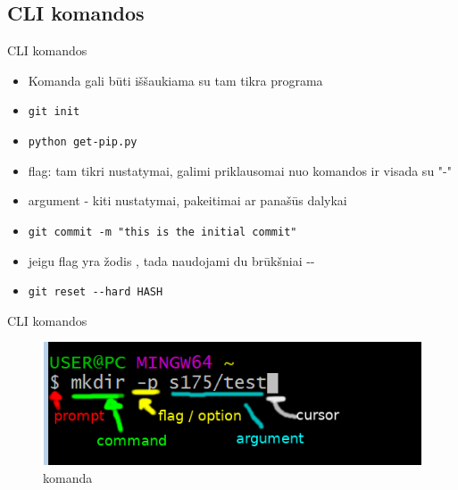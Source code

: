 \documentclass[11pt,xcolor=table]{beamer}
\begin{document}
\subsection{CLI komandos}
\begin{frame}[fragile]{CLI komandos}
\begin{itemize}
\item Komanda gali būti iššaukiama su tam tikra programa
\item \colorbox{listinggray}{\lstinline|git init|} {\color{red}{šitos komandos dabar nenaudot!}}
\item \colorbox{listinggray}{\lstinline|python get-pip.py|}{\color{red}{šitos komandos dabar nenaudot!}}
\item flag: tam tikri nustatymai, galimi priklausomai nuo komandos ir visada su "-"
\item argument - kiti nustatymai, pakeitimai ar panašūs dalykai
\item \colorbox{listinggray}{\lstinline|git commit -m "this is the initial commit"|} {\color{red}{šitos komandos dabar nenaudot!}}
\item jeigu flag yra žodis , tada naudojami du brūkšniai -\/- 
\item \colorbox{listinggray}{\lstinline|git reset --hard HASH|} {\color{red}{šitos komandos dabar nenaudot!}}

\end{itemize}
\end{frame}


\begin{frame}[fragile]{CLI komandos}
\begin{figure}
\caption{komanda}
\includegraphics[scale=0.7]{command.png}
\end{figure}
\end{frame}
\end{document}

